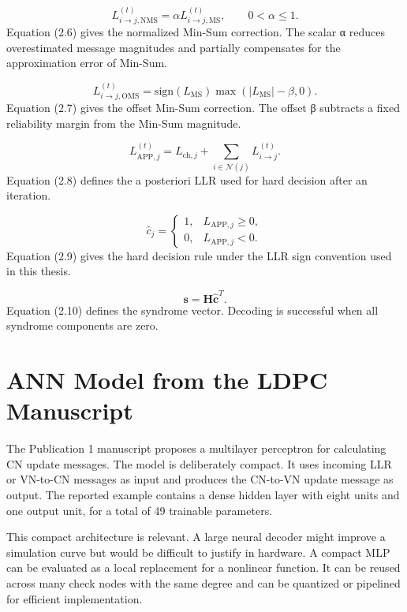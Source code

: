 \begin{equation}
L_{i\rightarrow j,\mathrm{NMS}}^{(t)}=\alpha L_{i\rightarrow j,\mathrm{MS}}^{(t)},\qquad 0<\alpha\le 1.
\end{equation}
Equation (2.6) gives the normalized Min-Sum correction. The scalar α reduces overestimated message magnitudes and partially compensates for the approximation error of Min-Sum.

\begin{equation}
L_{i\rightarrow j,\mathrm{OMS}}^{(t)}=\mathrm{sign}(L_{\mathrm{MS}})\max(|L_{\mathrm{MS}}|-\beta,0).
\end{equation}
Equation (2.7) gives the offset Min-Sum correction. The offset β subtracts a fixed reliability margin from the Min-Sum magnitude.

\begin{equation}
L_{\mathrm{APP},j}^{(t)}=L_{\mathrm{ch},j}+\sum_{i\in\mathcal{N}(j)}L_{i\rightarrow j}^{(t)}.
\end{equation}
Equation (2.8) defines the a posteriori LLR used for hard decision after an iteration.

\begin{equation}
\hat{c}_j=\begin{cases}1,&L_{\mathrm{APP},j}\ge 0,\\0,&L_{\mathrm{APP},j}<0.\end{cases}
\end{equation}
Equation (2.9) gives the hard decision rule under the LLR sign convention used in this thesis.

\begin{equation}
\mathbf{s}=\mathbf{H}\hat{\mathbf{c}}^{T}.
\end{equation}
Equation (2.10) defines the syndrome vector. Decoding is successful when all syndrome components are zero.

\section{ANN Model from the LDPC Manuscript}
The Publication 1 manuscript proposes a multilayer perceptron for calculating CN update messages. The model is deliberately compact. It uses incoming LLR or VN-to-CN messages as input and produces the CN-to-VN update message as output. The reported example contains a dense hidden layer with eight units and one output unit, for a total of 49 trainable parameters.

This compact architecture is relevant. A large neural decoder might improve a simulation curve but would be difficult to justify in hardware. A compact MLP can be evaluated as a local replacement for a nonlinear function. It can be reused across many check nodes with the same degree and can be quantized or pipelined for efficient implementation.

